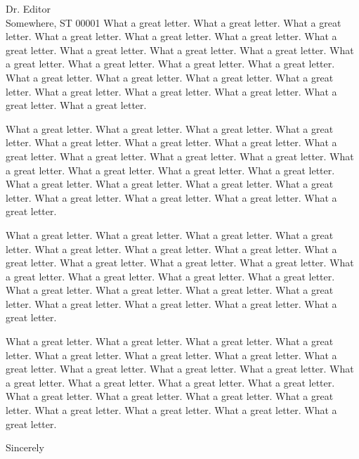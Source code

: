 \documentclass[ucd,esp,shortfrom,11pt]{ucletter}
\begin{document}
\begin{letter}{
    Dr. Editor \\
    Somewhere, ST 00001
}
What a great letter. What a great letter. What a great letter. What a great
letter. What a great letter. What a great letter. What a great letter. What a
great letter. What a great letter. What a great letter. What a great letter.
What a great letter. What a great letter. What a great letter. What a great
letter. What a great letter. What a great letter. What a great letter. What a
great letter. What a great letter. What a great letter. What a great letter.
What a great letter.


What a great letter. What a great letter. What a great letter. What a great
letter. What a great letter. What a great letter. What a great letter. What a
great letter. What a great letter. What a great letter. What a great letter.
What a great letter. What a great letter. What a great letter. What a great
letter. What a great letter. What a great letter. What a great letter. What a
great letter. What a great letter. What a great letter. What a great letter.
What a great letter.

What a great letter. What a great letter. What a great letter. What a great
letter. What a great letter. What a great letter. What a great letter. What a
great letter. What a great letter. What a great letter. What a great letter.
What a great letter. What a great letter. What a great letter. What a great
letter. What a great letter. What a great letter. What a great letter. What a
great letter. What a great letter. What a great letter. What a great letter.
What a great letter.

What a great letter. What a great letter. What a great letter. What a great
letter. What a great letter. What a great letter. What a great letter. What a
great letter. What a great letter. What a great letter. What a great letter.
What a great letter. What a great letter. What a great letter. What a great
letter. What a great letter. What a great letter. What a great letter. What a
great letter. What a great letter. What a great letter. What a great letter.
What a great letter.

\closing{Sincerely}


\end{letter}
\end{document}
